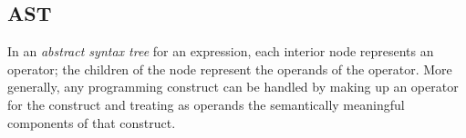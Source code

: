 \subsection{AST}
In an \textit{abstract syntax tree} for an expression, each interior node represents an operator; the children of the node represent the operands of the operator. More generally, any programming construct can be handled by making up an operator for the construct and treating as operands the semantically meaningful components of that construct. 